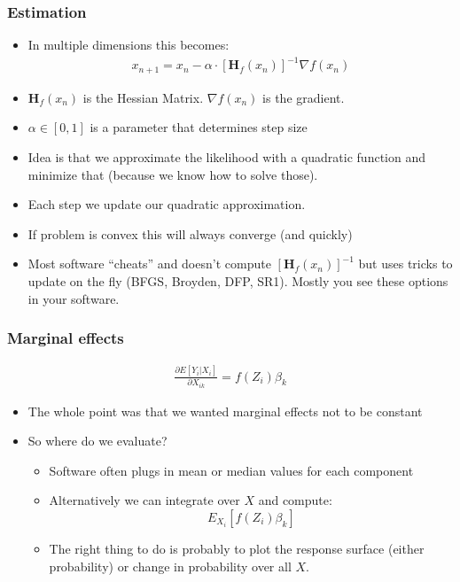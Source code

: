 \documentclass[aspectratio=169]{beamer}
\begin{document}
\begin{frame}
\frametitle{Estimation}
\begin{itemize} 
\item In multiple dimensions this becomes:
\begin{eqnarray*}
x_{n+1} = x_{n} - \alpha \cdot \left[\mathbf{H}_f (x_n) \right]^{-1} \nabla f(x_n)
\end{eqnarray*}
\item $\mathbf{H}_f (x_n)$ is the \alert{Hessian} Matrix. $ \nabla f(x_n)$ is the \alert{gradient}.
\item $\alpha \in [0,1]$ is a parameter that determines \alert{step size}
\item Idea is that we approximate the likelihood with a quadratic function and minimize that (because we know how to solve those).
\item Each step we update our quadratic approximation.
\item If problem is \alert{convex} this will always converge (and quickly)
\item Most software ``cheats'' and doesn't compute $\left[\mathbf{H}_f (x_n) \right]^{-1}$ but uses tricks to update on the fly (BFGS, Broyden, DFP, SR1). Mostly you see these options in your software.
\end{itemize}
\end{frame}


\begin{frame}
\frametitle{Marginal effects}
\begin{eqnarray*}
\frac{\partial E[Y_i | X_i] }{\partial X_{ik}} = f (Z_i) \beta_k
\end{eqnarray*}
\begin{itemize}
\item The whole point was that we wanted marginal effects not to be constant
\item So where do we evaluate?
\begin{itemize}
\item Software often plugs in mean or median values for each component
\item Alternatively we can integrate over $X$ and compute:
$$
E_{X_i}[ f (Z_i) \beta_k]
$$
\item The right thing to do is probably to plot the response surface (either probability) or change in probability over all $X$.
\end{itemize}
\end{itemize}
\end{frame}
\end{document}
